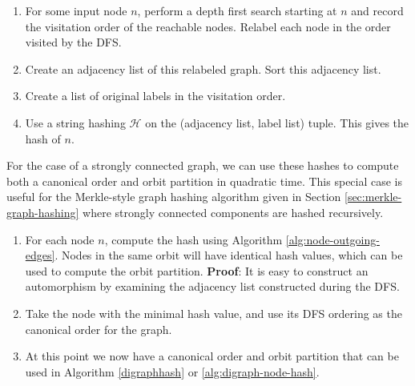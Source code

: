 \documentclass{svproc}
\begin{document}
\begin{algorithm}[H]
    \caption{Node Hash - Outgoing Ordered Edges}\label{alg:node-outgoing-edges}
    \begin{enumerate}
        \item For some input node $n$, perform a depth first search starting at $n$ and record the visitation order of the reachable nodes. Relabel each node in the order visited by the DFS.
        \item Create an adjacency list of this relabeled graph. Sort this adjacency list.
        \item Create a list of original labels in the visitation order.
        \item Use a string hashing $\mathcal{H}$ on the (adjacency list, label list) tuple. This gives the hash of $n$.
    \end{enumerate}    
\end{algorithm}

For the case of a strongly connected graph, we can use these hashes to compute both a canonical order and orbit partition in quadratic time. This special case is useful for the Merkle-style graph hashing algorithm given in Section \ref{sec:merkle-graph-hashing} where strongly connected components are hashed recursively.

\begin{algorithm}[H]
    \caption{Canonization and Orbit Partitioning for Strongly Connected Outgoing Ordered Edge Graphs}\label{alg:scc-outgoing-edges}
    \begin{enumerate}
        \item For each node $n$, compute the hash using Algorithm \ref{alg:node-outgoing-edges}. Nodes in the same orbit will have identical hash values, which can be used to compute the orbit partition. \textbf{Proof}: It is easy to construct an automorphism by examining the adjacency list constructed during the DFS.
        \item Take the node with the minimal hash value, and use its DFS ordering as the canonical order for the graph.
        \item At this point we now have a canonical order and orbit partition that can be used in Algorithm \ref{digraphhash} or \ref{alg:digraph-node-hash}.
    \end{enumerate}
\end{algorithm}
\end{document}
